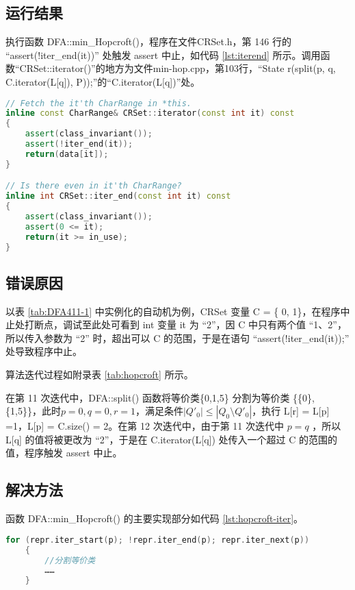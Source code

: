 \subsection{运行结果}\label{sec:hopcroft-error}
执行函数 DFA::min\_Hopcroft()，程序在文件CRSet.h，第 146 行的 “assert(!iter\_end(it))” 处触发 assert 中止，如代码 \ref{lst:iterend} 所示。调用函数“CRSet::iterator()”的地方为文件min-hop.cpp，第103行，“State r(split(p, q, C.iterator(L[q]), P));”的“C.iterator(L[q])”处。
\lstset{style=mystyle}
\begin{lstlisting}[language=C++,label={lst:iterend},caption={ CRSet.h },firstnumber=142]
// Fetch the it'th CharRange in *this.
inline const CharRange& CRSet::iterator(const int it) const
{
    assert(class_invariant());
    assert(!iter_end(it));
    return(data[it]);
}

// Is there even in it'th CharRange?
inline int CRSet::iter_end(const int it) const
{
    assert(class_invariant());
    assert(0 <= it);
    return(it >= in_use);
}
\end{lstlisting}

\subsection{错误原因}

以表 \ref{tab:DFA411-1} 中实例化的自动机为例，CRSet 变量 C = \{ 0, 1\}，在程序中止处打断点，调试至此处可看到 int 变量 it 为 “2”，因 C 中只有两个值 “1、2”，所以传入参数为 “2” 时，超出可以 C 的范围，于是在语句 “assert(!iter\_end(it));” 处导致程序中止。

算法迭代过程如附录表 \ref{tab:hopcroft} 所示。

在第 11 次迭代中，DFA::split() 函数将等价类\{0,1,5\} 分割为等价类 \{\{0\},\{1,5\}\}，此时$p=0,q=0,r=1$，满足条件$|Q'_0| \leq | Q_0 \setminus Q'_0 |$，执行 L[r] = L[p] =1，L[p] = C.size() = 2。在第 12 次迭代中，由于第 11 次迭代中 $p=q$ ，所以 L[q] 的值将被更改为 “2”，于是在 C.iterator(L[q]) 处传入一个超过 C 的范围的值，程序触发 assert 中止。

\subsection{解决方法}

函数 DFA::min\_Hopcroft() 的主要实现部分如代码 \ref{lst:hopcroft-iter}。
\lstset{style=mystyle}
\begin{lstlisting}[language=C++,label={lst:hopcroft-iter},caption={ min-hop.cpp },firstnumber=100]
    for (repr.iter_start(p); !repr.iter_end(p); repr.iter_next(p))
    {
        //分割等价类
        ……
    }
\end{lstlisting}

